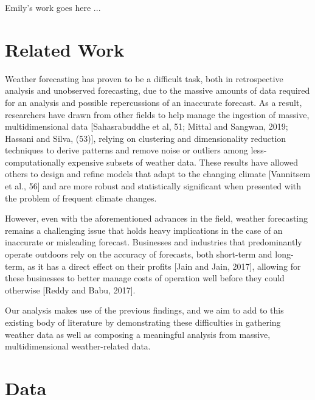 \documentclass[conference]{IEEEtran}
\begin{document}
Emily's work goes here ...

\section{Related Work}

Weather forecasting has proven to be a difficult task, both in retrospective analysis and unobserved forecasting, due to the massive amounts of data required for an analysis and possible repercussions of an inaccurate forecast. As a result, researchers have drawn from other fields to help manage the ingestion of massive, multidimensional data [Sahasrabuddhe et al, 51; Mittal and Sangwan, 2019; Hassani and Silva, (53)], relying on clustering and dimensionality reduction techniques to derive patterns and remove noise or outliers among less-computationally expensive subsets of weather data. These results have allowed others to design and refine models that adapt to the changing climate [Vannitsem et al., 56] and are more robust and statistically significant when presented with the problem of frequent climate changes.

However, even with the aforementioned advances in the field, weather forecasting remains a challenging issue that holds heavy implications in the case of an inaccurate or misleading forecast. Businesses and industries that predominantly operate outdoors rely on the accuracy of forecasts, both short-term and long-term, as it has a direct effect on their profits [Jain and Jain, 2017], allowing for these businesses to better manage costs of operation well before they could otherwise [Reddy and Babu, 2017].

Our analysis makes use of the previous findings, and we aim to add to this existing body of literature by demonstrating these difficulties in gathering weather data as well as composing a meaningful analysis from massive, multidimensional weather-related data.

\section{Data}
  
\end{document}
